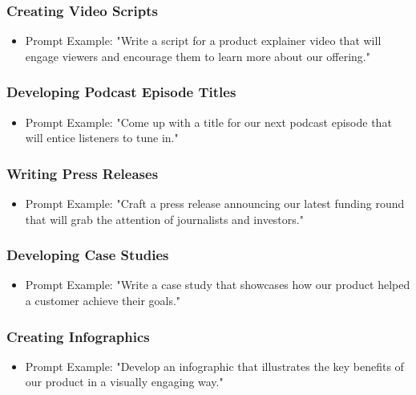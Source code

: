\begin{frame}[fragile]\frametitle{Creating Video Scripts}
\begin{itemize}
\item Prompt Example: "Write a script for a product explainer video that will engage viewers and encourage them to learn more about our offering."
\end{itemize}
\end{frame}

\begin{frame}[fragile]\frametitle{Developing Podcast Episode Titles}
\begin{itemize}
\item Prompt Example: "Come up with a title for our next podcast episode that will entice listeners to tune in."
\end{itemize}
\end{frame}

\begin{frame}[fragile]\frametitle{Writing Press Releases}
\begin{itemize}
\item Prompt Example: "Craft a press release announcing our latest funding round that will grab the attention of journalists and investors."
\end{itemize}
\end{frame}

\begin{frame}[fragile]\frametitle{Developing Case Studies}
\begin{itemize}
\item Prompt Example: "Write a case study that showcases how our product helped a customer achieve their goals."
\end{itemize}
\end{frame}

\begin{frame}[fragile]\frametitle{Creating Infographics}
\begin{itemize}
\item Prompt Example: "Develop an infographic that illustrates the key benefits of our product in a visually engaging way."
\end{itemize}
\end{frame}

